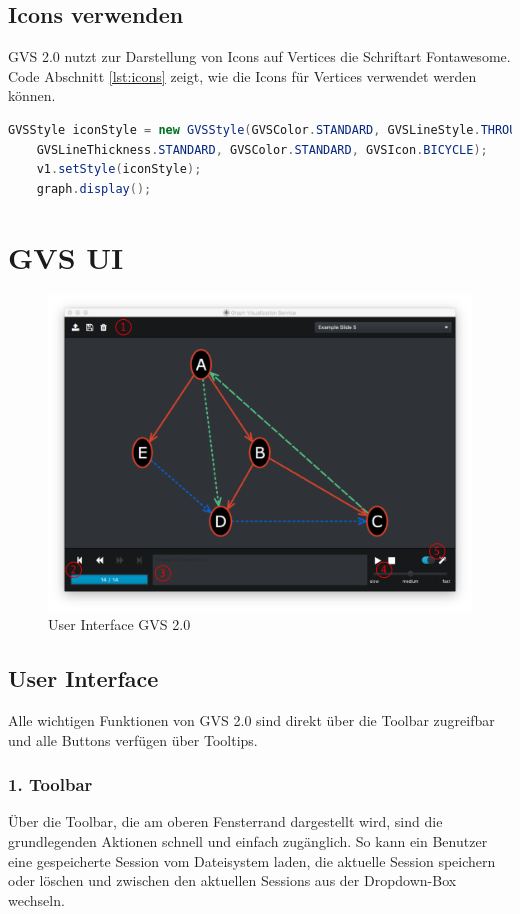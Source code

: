 \documentclass[11pt,a4paper,english,oneside]{book}
\numberwithin{equation}{chapter}
\begin{document}
	\subsection{Icons verwenden}
	GVS 2.0 nutzt zur Darstellung von Icons auf Vertices die Schriftart Fontawesome. Code Abschnitt \ref{lst:icons} zeigt, wie die Icons für Vertices verwendet werden können.
	
	\begin{lstlisting}[language=java, frame=single, caption={Icons benutzen}, label={lst:icons}]
	GVSStyle iconStyle = new GVSStyle(GVSColor.STANDARD, GVSLineStyle.THROUGH,
	GVSLineThickness.STANDARD, GVSColor.STANDARD, GVSIcon.BICYCLE);
	v1.setStyle(iconStyle);
	graph.display();
	\end{lstlisting}	
	
	\section{GVS UI}
		\begin{figure}[h!]
		\centering
		\includegraphics[width=0.7\linewidth]{assets/images/gvs-ui-graph}
		\caption{User Interface GVS 2.0}
		\label{fig:gvs-ui-graph}
	\end{figure}

	\subsection{User Interface}
	Alle wichtigen Funktionen von GVS 2.0 sind direkt über die Toolbar zugreifbar und alle Buttons verfügen über Tooltips. 
	
	\subsubsection{1. Toolbar}
	Über die Toolbar, die am oberen Fensterrand dargestellt wird, sind die grundlegenden Aktionen schnell und einfach zugänglich. So kann ein Benutzer eine gespeicherte Session vom Dateisystem laden, die aktuelle Session speichern oder löschen und zwischen den aktuellen Sessions aus der Dropdown-Box wechseln. 
	
\end{document}
